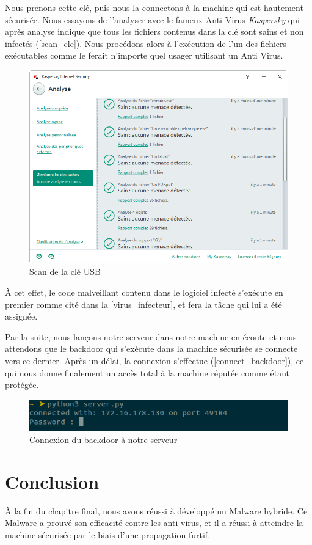Nous prenons cette clé, puis nous la connectons à la machine qui est hautement sécurisée. Nous essayons de 
l'analyser avec le fameux Anti Virus \emph{Kaspersky} qui après analyse indique que tous les fichiers contenus 
dans la clé sont sains et non infectés (\autoref{scan_cle}). Nous procédons alors à l’exécution de l'un des 
fichiers exécutables comme le ferait n'importe quel usager utilisant un Anti Virus.

\begin{figure}[H]
    \centering
    \includegraphics[width=\linewidth]{images/scan_by_antivirus.png}
    \caption{Scan de la clé USB}
    \label{scan_cle}
\end{figure}

À cet effet, le code malveillant contenu dans le logiciel infecté s’exécute en premier comme cité dans la 
\autoref{virus_infecteur}, et fera la tâche qui lui a été assignée.

Par la suite, nous lançons notre serveur dans notre machine en écoute et nous attendons que le backdoor qui 
s'exécute dans la machine sécurisée se connecte vers ce dernier. Après un délai, la connexion s'effectue 
(\autoref{connect_backdoor}), ce qui nous donne finalement un accès total à la machine réputée comme étant protégée.

\begin{figure}[H]
    \centering
    \includegraphics[width=\linewidth]{images/backdoor_connect.png}
    \caption{Connexion du backdoor à notre serveur}
    \label{connect_backdoor}
\end{figure}

\section{Conclusion}
À la fin du chapitre final, nous avons réussi à développé un Malware hybride. Ce Malware a prouvé son efficacité
contre les anti-virus, et il a réussi à atteindre la machine sécurisée par le biais d'une propagation furtif.
